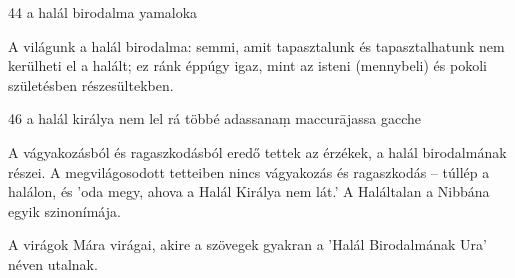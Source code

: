 
\begin{notesdescription}

\item[{44}
{a halál birodalma}
{yamaloka}] \hfill\par

A világunk a halál birodalma: semmi, amit tapasztalunk és tapasztalhatunk nem kerülheti el a halált; ez ránk éppúgy igaz, mint az isteni (mennybeli) és pokoli születésben részesültekben.

\item[{46}
{a halál királya nem lel rá többé}
{adassanaṃ maccurājassa gacche}] \hfill\par

A vágyakozásból és ragaszkodásból eredő tettek az érzékek, a halál birodalmának részei. A megvilágosodott tetteiben nincs vágyakozás és ragaszkodás -- túllép a halálon, és 'oda megy, ahova a Halál Királya nem lát.' A Haláltalan a Nibbána egyik szinonímája.

A virágok Mára virágai, akire a szövegek gyakran a 'Halál Birodalmának Ura' néven utalnak.

\end{notesdescription}
